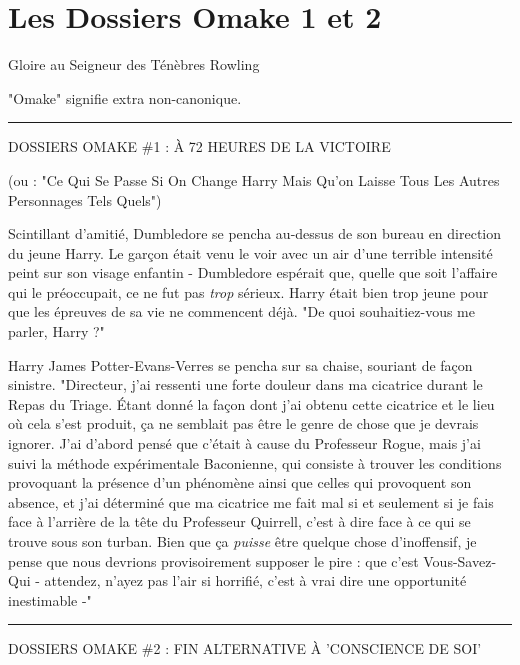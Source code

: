 
\chapter{Les Dossiers Omake 1 et 2}

Gloire au Seigneur des Ténèbres Rowling

"Omake" signifie extra non-canonique.
\par\noindent\rule{\textwidth}{0.4pt}

\begin{center}\MakeUppercase{DOSSIERS OMAKE \#1 : À 72 heures de la victoire}\end{center}



\begin{center}(ou : "Ce Qui Se Passe Si On Change Harry Mais Qu'on Laisse Tous Les Autres Personnages Tels Quels")\end{center}


Scintillant d'amitié, Dumbledore se pencha au-dessus de son bureau en direction du jeune Harry. Le garçon était venu le voir avec un air d'une terrible intensité peint sur son visage enfantin - Dumbledore espérait que, quelle que soit l'affaire qui le préoccupait, ce ne fut pas \emph{trop}  sérieux. Harry était bien trop jeune pour que les épreuves de sa vie ne commencent déjà. "De quoi souhaitiez-vous me parler, Harry ?"

Harry James Potter-Evans-Verres se pencha sur sa chaise, souriant de façon sinistre. "Directeur, j'ai ressenti une forte douleur dans ma cicatrice durant le Repas du Triage. Étant donné la façon dont j'ai obtenu cette cicatrice et le lieu où cela s'est produit, ça ne semblait pas être le genre de chose que je devrais ignorer. J'ai d'abord pensé que c'était à cause du Professeur Rogue, mais j'ai suivi la méthode expérimentale Baconienne, qui consiste à trouver les conditions provoquant la présence d'un phénomène ainsi que celles qui provoquent son absence, et j'ai déterminé que ma cicatrice me fait mal si et seulement si je fais face à l'arrière de la tête du Professeur Quirrell, c'est à dire face à ce qui se trouve sous son turban. Bien que ça \emph{puisse}  être quelque chose d'inoffensif, je pense que nous devrions provisoirement supposer le pire : que c'est Vous-Savez-Qui - attendez, n'ayez pas l'air si horrifié, c'est à vrai dire une opportunité inestimable -"
\par\noindent\rule{\textwidth}{0.4pt}

\begin{center}\MakeUppercase{DOSSIERS OMAKE \#2 : Fin Alternative à 'Conscience de Soi'}\end{center}


